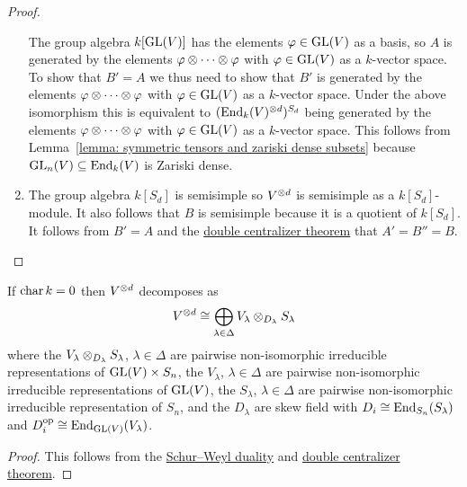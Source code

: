 \begin{proof}
\begin{enumerate}
      The group algebra $k[\operatorname{GL}(V)]$ has the elements $\varphi \in \operatorname{GL}(V)$ as a basis, so $A$ is generated by the elements $\varphi \mathbin{\otimes} \dotsb \mathbin{\otimes} \varphi$ with $\varphi \in \operatorname{GL}(V)$ as a $k$-vector space.
      To show that $B' = A$ we thus need to show that $B'$ is generated by the elements $\varphi \mathbin{\otimes} \dotsb \mathbin{\otimes} \varphi$ with $\varphi \in \operatorname{GL}(V)$ as a $k$-vector space.
      Under the above isomorphism this is equivalent to $(\operatorname{End}_k(V)^{\mathbin{\otimes} d})^{S_d}$ being generated by the elements $\varphi \mathbin{\otimes} \dotsb \mathbin{\otimes} \varphi$ with $\varphi \in \operatorname{GL}(V)$ as a $k$-vector space.
      This follows from Lemma~\ref{lemma: symmetric tensors and zariski dense subsets} because $\operatorname{GL}_n(V) \subseteq \operatorname{End}_k(V)$ is Zariski dense.
    \item
      The group algebra $k[S_d]$ is semisimple so $V^{\mathbin{\otimes} d}$ is semisimple as a $k[S_d]$-module.
      It also follows that $B$ is semisimple because it is a quotient of $k[S_d]$.
      It follows from $B' = A$ and the \hyperref[corollary: special double centralizer theorem]{double centralizer theorem} that $A' = B'' = B$.
    \qedhere
  \end{enumerate}
\end{proof}


\begin{corollary}
  If $\operatorname{char} k = 0$ then $V^{\mathbin{\otimes} d}$ decomposes as
  \[
          V^{\mathbin{\otimes} d}
    \cong \bigoplus_{\lambda \in \Delta} V_\lambda \mathbin{\otimes}_{D_\lambda} S_\lambda
  \]
  where the $V_\lambda \mathbin{\otimes}_{D_\lambda} S_\lambda$, $\lambda \in \Delta$ are pairwise non-isomorphic irreducible representations of $\operatorname{GL}(V) \times S_n$, the $V_\lambda$, $\lambda \in \Delta$ are pairwise non-isomorphic irreducible representations of $\operatorname{GL}(V)$, the $S_\lambda$, $\lambda \in \Delta$ are pairwise non-isomorphic irreducible representation of $S_n$, and the $D_\lambda$ are skew field with $D_i \cong \operatorname{End}_{S_n}(S_\lambda)$ and $D_i^{\operatorname{op}} \cong \operatorname{End}_{\operatorname{GL}(V)}(V_\lambda)$.
\end{corollary}


\begin{proof}
  This follows from the \hyperref[theorem: schur weyl duality]{Schur--Weyl duality} and \hyperref[corollary: special double centralizer theorem]{double centralizer theorem}.
\end{proof}


